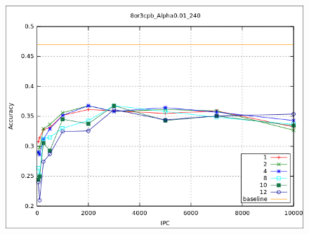 			\begin{figure}[htbp]
				\centering
				\includegraphics[scale=0.6]{img/resultados/sinteticas/worst_bootstrap_8or3cpb_Alpha0,01_240.png}
				\caption[Sintéticas bootstrap peor resultado]{}
				\label{fig: Sinteticas-bootstrap-bajo}
			\end{figure}